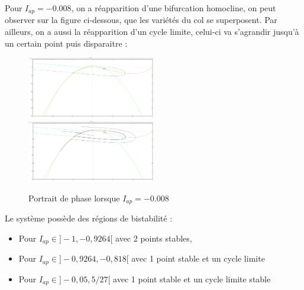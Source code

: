 \documentclass{article}
\begin{document}
Pour $I_{ap} = -0.008$, on a réapparition d'une bifurcation homocline, on peut observer sur la figure ci-dessous, que les variétés du col se superposent. Par ailleurs, on a aussi la réapparition d'un cycle limite, celui-ci va s'agrandir jusqu'à un certain point puis disparaitre  :
\begin{figure}[H]
    \centering
    \includegraphics[width=0.5\textwidth]{I-0_008bis.png}
    \includegraphics[width=0.5\textwidth]{I-0_008.png}
    \caption{Portrait de phase lorsque $I_{ap} = -0.008$ }
\end{figure}


Le système possède des régions de bistabilité :
\begin{itemize}
\item Pour $I_{ap} \in ]-1, -0,9264[$ avec 2 points stables,
\item Pour $I_{ap} \in ]-0,9264, -0,818[$ avec 1 point stable et un cycle limite
\item Pour  $I_{ap} \in ] -0,05, 5/27[$ avec 1 point stable et un cycle limite stable
\end{itemize}
\end{document}
